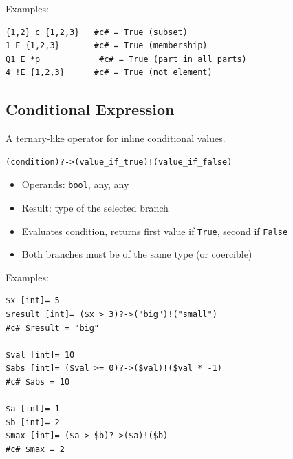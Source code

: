 \documentclass{report}
\begin{document}
Examples:
\begin{verbatim}
{1,2} c {1,2,3}   #c# = True (subset)
1 E {1,2,3}       #c# = True (membership)
Q1 E *p            #c# = True (part in all parts)
4 !E {1,2,3}      #c# = True (not element)
\end{verbatim}

\subsection{Conditional Expression}
A ternary-like operator for inline conditional values.
\begin{verbatim}
(condition)?->(value_if_true)!(value_if_false)
\end{verbatim}

\begin{itemize}
\item Operands: \texttt{bool}, any, any
\item Result: type of the selected branch
\item Evaluates condition, returns first value if \texttt{True}, second if \texttt{False}
\item Both branches must be of the same type (or coercible)
\end{itemize}

Examples:
\begin{verbatim}
$x [int]= 5
$result [int]= ($x > 3)?->("big")!("small")
#c# $result = "big"

$val [int]= 10
$abs [int]= ($val >= 0)?->($val)!($val * -1)
#c# $abs = 10

$a [int]= 1
$b [int]= 2
$max [int]= ($a > $b)?->($a)!($b)
#c# $max = 2
\end{verbatim}
\end{document}
